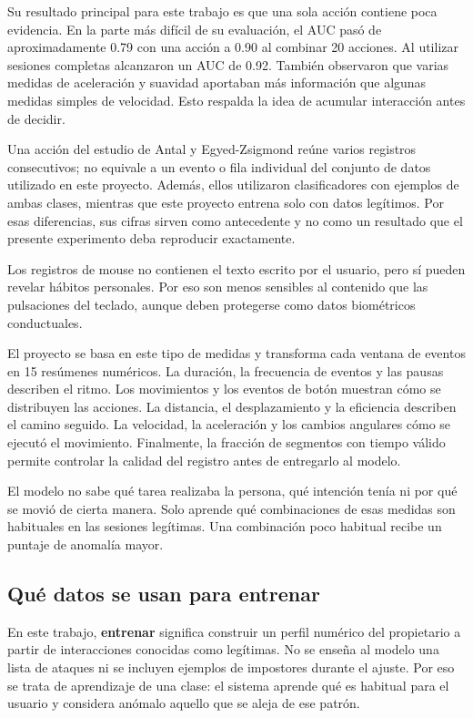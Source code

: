 \documentclass[11pt,letterpaper]{article}
\begin{document}
Su resultado principal para este trabajo es que una sola acción contiene poca evidencia. En la parte más difícil de
su evaluación, el AUC pasó de aproximadamente 0.79 con una acción a 0.90 al combinar 20 acciones. Al utilizar
sesiones completas alcanzaron un AUC de 0.92. También observaron que varias medidas de aceleración y suavidad
aportaban más
información que algunas medidas simples de velocidad. Esto respalda la idea de acumular interacción antes de decidir.

Una acción del estudio de Antal y Egyed-Zsigmond reúne varios registros consecutivos; no equivale a un evento o fila
individual del conjunto de datos utilizado en este proyecto. Además, ellos utilizaron clasificadores con ejemplos de
ambas clases, mientras que este proyecto entrena solo con datos legítimos. Por esas diferencias, sus cifras sirven
como antecedente y no como un resultado que el presente experimento deba reproducir exactamente.

Los registros de mouse no contienen el texto escrito por el usuario, pero sí pueden revelar hábitos personales. Por
eso son menos sensibles al contenido que las pulsaciones del teclado, aunque deben protegerse como datos biométricos
conductuales.

El proyecto se basa en este tipo de medidas y transforma cada ventana de eventos en 15 resúmenes numéricos. La
duración, la frecuencia de eventos y las pausas describen el ritmo. Los movimientos y los eventos de botón muestran
cómo se distribuyen las acciones. La distancia, el desplazamiento y la eficiencia describen el camino seguido. La
velocidad, la aceleración y los cambios angulares cómo se ejecutó el movimiento. Finalmente, la fracción de
segmentos con tiempo válido permite controlar la calidad del registro antes de entregarlo al modelo.

El modelo no sabe qué tarea realizaba la persona, qué intención tenía ni por qué se movió de cierta manera. Solo
aprende qué combinaciones de esas medidas son habituales en las sesiones legítimas. Una combinación poco habitual
recibe un puntaje de anomalía mayor.


\subsection{Qué datos se usan para entrenar}
\label{sec:training}

En este trabajo, \textbf{entrenar} significa construir un perfil numérico del propietario a partir de interacciones
conocidas como legítimas. No se enseña al modelo una lista de ataques ni se incluyen ejemplos de impostores durante
el ajuste. Por eso se trata de aprendizaje de una clase: el sistema aprende qué es habitual para el usuario y considera
anómalo aquello que se aleja de ese patrón.
\end{document}
